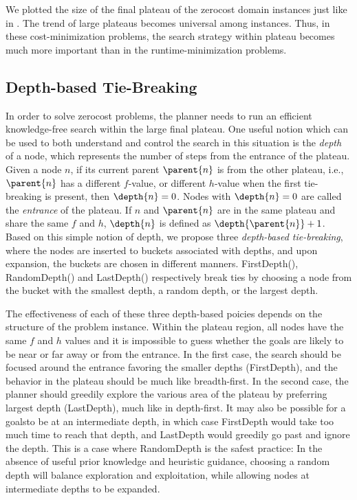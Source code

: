 We plotted the size of the final plateau of the zerocost domain instances just like in
. The trend of large plateaus becomes universal among
instances. Thus, in these cost-minimization problems, the search strategy within
plateau becomes much more important than in the
runtime-minimization problems.

\subsection{Depth-based Tie-Breaking}

In order to solve zerocost problems, the planner needs to run an
efficient knowledge-free search within the large final plateau.
One useful notion which can be used to both understand and control the
search in this situation is the \emph{depth} of a node, which represents
the number of steps from the entrance of the plateau.  Given a node $n$,
if its current parent $\parent{n}$ is from the other plateau, i.e.,
$\parent{n}$ has a different $f$-value, or different $h$-value when the
first tie-breaking is present, then $\depth{n} = 0$. Nodes with
$\depth{n} = 0$ are called the \emph{entrance} of the plateau.  If $n$
and $\parent{n}$ are in the same plateau and share the same $f$ and $h$,
$\depth{n}$ is defined as $\depth{\parent{n}} + 1$.  Based on this
simple notion of depth, we propose three \emph{depth-based
tie-breaking}, where the nodes are inserted to buckets associated with
depths, and upon expansion, the buckets are chosen in different manners.
FirstDepth(\fd), RandomDepth(\rd) and LastDepth(\ld) respectively break
ties by choosing a node from the bucket with the smallest depth, a
random depth, or the largest depth.

The effectiveness of each of these three depth-based poicies depends on the
structure of the problem instance.  Within
the plateau region, all nodes have the same $f$ and $h$ values
and it is impossible to guess whether the goals are likely to be  near or far
away or from the entrance.  In the first case, the
search should be focused around the entrance favoring the smaller depths
(FirstDepth), and the behavior in the plateau should be much like breadth-first. In the
second case, the planner should greedily explore the various area of the
plateau by preferring largest depth (LastDepth), much like in
depth-first. 
It may also be possible for a goalsto be at an intermediate depth, in which case
FirstDepth would take too much time to reach that
depth, and LastDepth would greedily go past and ignore the depth.
This is a case
where RandomDepth is the safest practice: 
In the absence of useful prior knowledge and heuristic guidance,
choosing a random depth will balance exploration and exploitation,
while allowing nodes at intermediate depths to be expanded.

